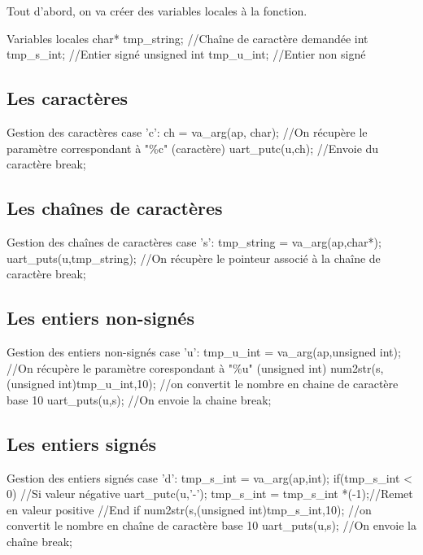 Tout d'abord, on va créer des variables locales à la fonction.

\begin{Cpp}{Variables locales}
	char* tmp_string;		//Chaîne de caractère demandée
	int tmp_s_int;			//Entier signé
	unsigned int tmp_u_int; //Entier non signé
\end{Cpp}

\subsection{Les caractères}

\begin{Cpp}{Gestion des caractères}
	case 'c':
		ch = va_arg(ap, char);  	//On récupère le paramètre correspondant à "\%c" (caractère)
	    uart_putc(u,ch); 			//Envoie du caractère
		break;
\end{Cpp}


\subsection{Les chaînes de caractères}

\begin{Cpp}{Gestion des chaînes de caractères}
    case 's':
		tmp_string = va_arg(ap,char*);
		uart_puts(u,tmp_string); //On récupère le pointeur associé à la chaîne de caractère
		break;
\end{Cpp}

\subsection{Les entiers non-signés}

\begin{Cpp}{Gestion des entiers non-signés}
	case 'u':
		tmp_u_int = va_arg(ap,unsigned int);	//On récupère le paramètre corespondant à "\%u" (unsigned int)
		num2str(s,(unsigned int)tmp_u_int,10);	//on convertit le nombre en chaine de caractère base 10
					uart_puts(u,s);							//On envoie la chaine
					break;
\end{Cpp}

\subsection{Les entiers signés}

\begin{Cpp}{Gestion des entiers signés}
    case 'd':
	    tmp_s_int = va_arg(ap,int);
		if(tmp_s_int < 0) { //Si valeur négative
			uart_putc(u,'-'); 
			tmp_s_int = tmp_s_int *(-1);//Remet en valeur positive
		}//End if
		num2str(s,(unsigned int)tmp_s_int,10);	//on convertit le nombre en chaîne de caractère base 10
		uart_puts(u,s);						//On envoie la chaîne
		break;
\end{Cpp}

